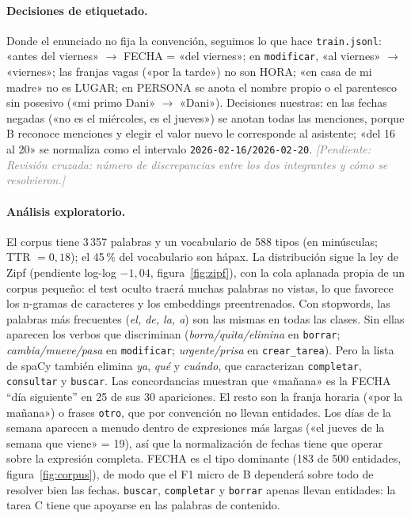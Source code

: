 \documentclass[10pt,a4paper]{article}
\newcommand{\cod}[1]{\texttt{#1}}
\newcommand{\pendiente}[1]{\textcolor{gray}{\textit{[Pendiente: #1]}}}
\begin{document}
\paragraph{Decisiones de etiquetado.} Donde el enunciado no fija la convención, seguimos lo que hace \cod{train.jsonl}: «antes del viernes» $\rightarrow$ FECHA = «del viernes»; en \cod{modificar}, «al viernes» $\rightarrow$ «viernes»; las franjas vagas («por la tarde») no son HORA; «en casa de mi madre» no es LUGAR; en PERSONA se anota el nombre propio o el parentesco sin posesivo («mi primo Dani» $\rightarrow$ «Dani»). Decisiones nuestras: en las fechas negadas («no es el miércoles, es el jueves») se anotan todas las menciones, porque B reconoce menciones y elegir el valor nuevo le corresponde al asistente; «del 16 al 20» se normaliza como el intervalo \cod{2026-02-16/2026-02-20}.
\pendiente{Revisión cruzada: número de discrepancias entre los dos integrantes y cómo se resolvieron.}

\paragraph{Análisis exploratorio.} El corpus tiene 3\,357 palabras y un vocabulario de 588 tipos (en minúsculas; TTR $=0{,}18$); el 45\,\% del vocabulario son hápax. La distribución sigue la ley de Zipf (pendiente log-log $-1{,}04$, figura~\ref{fig:zipf}), con la cola aplanada propia de un corpus pequeño: el test oculto traerá muchas palabras no vistas, lo que favorece los n-gramas de caracteres y los embeddings preentrenados. Con stopwords, las palabras más frecuentes (\textit{el, de, la, a}) son las mismas en todas las clases. Sin ellas aparecen los verbos que discriminan (\textit{borra/quita/elimina} en \cod{borrar}; \textit{cambia/mueve/pasa} en \cod{modificar}; \textit{urgente/prisa} en \cod{crear\_tarea}). Pero la lista de spaCy también elimina \textit{ya}, \textit{qué} y \textit{cuándo}, que caracterizan \cod{completar}, \cod{consultar} y \cod{buscar}. Las concordancias muestran que «mañana» es la FECHA ``día siguiente'' en 25 de sus 30 apariciones. El resto son la franja horaria («por la mañana») o frases \cod{otro}, que por convención no llevan entidades. Los días de la semana aparecen a menudo dentro de expresiones más largas («el jueves de la semana que viene» = 19), así que la normalización de fechas tiene que operar sobre la expresión completa. FECHA es el tipo dominante (183 de 500 entidades, figura~\ref{fig:corpus}), de modo que el F1 micro de B dependerá sobre todo de resolver bien las fechas. \cod{buscar}, \cod{completar} y \cod{borrar} apenas llevan entidades: la tarea C tiene que apoyarse en las palabras de contenido.
\end{document}
